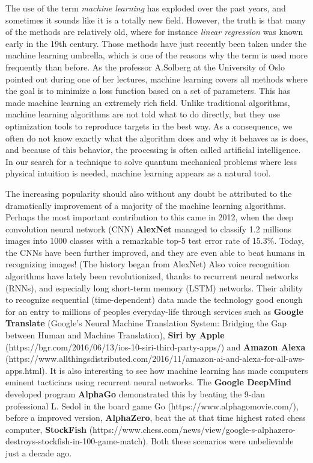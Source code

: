 The use of the term \textit{machine learning} has exploded over the past years, and sometimes it sounds like it is a totally new field. However, the truth is that many of the methods are relatively old, where for instance \textit{linear regression} was known early in the 19th century. \cite{legendre_nouvelles_1805, gauss_theoria_1809} Those methods have just recently been taken under the machine learning umbrella, which is one of the reasons why the term is used more frequently than before. As the professor A.Solberg at the University of Oslo pointed out during one of her lectures, machine learning covers all methods where the goal is to minimize a loss function based on a set of parameters. This has made machine learning an extremely rich field. Unlike traditional algorithms, machine learning algorithms are not told what to do directly, but they use optimization tools to reproduce targets in the best way. As a consequence, we often do not know exactly what the algorithm does and why it behaves as is does, and because of this behavior, the processing is often called artificial intelligence. In our search for a technique to solve quantum mechanical problems where less physical intuition is needed, machine learning appears as a natural tool.

The increasing popularity should also without any doubt be attributed to the dramatically improvement of a majority of the machine learning algorithms. Perhaps the most important contribution to this came in 2012, when the deep convolution neural network (CNN) \textbf{AlexNet} managed to classify 1.2 millions images into 1000 classes with a remarkable top-5 test error rate of 15.3\%. \cite{krizhevsky_imagenet_2012} Today, the CNNs have been further improved, and they are even able to beat humans in recognizing images! (The history began from AlexNet) Also voice recognition algorithms have lately been revolutionized, thanks to recurrent neural networks (RNNs), and especially long short-term memory (LSTM) networks. Their ability to recognize sequential (time-dependent) data made the technology good enough for an entry to millions of peoples everyday-life through services such as \textbf{Google Translate} (Google’s Neural Machine Translation System: Bridging the Gap between Human and Machine Translation), \textbf{Siri by Apple} (https://bgr.com/2016/06/13/ios-10-siri-third-party-apps/) and \textbf{Amazon Alexa} (https://www.allthingsdistributed.com/2016/11/amazon-ai-and-alexa-for-all-aws-apps.html). It is also interesting to see how machine learning has made computers eminent tacticians using recurrent neural networks. The \textbf{Google DeepMind} developed program \textbf{AlphaGo} demonstrated this by beating the 9-dan professional L. Sedol in the board game Go (https://www.alphagomovie.com/), before a improved version, \textbf{AlphaZero}, beat the at that time highest rated chess computer, \textbf{StockFish} (https://www.chess.com/news/view/google-s-alphazero-destroys-stockfish-in-100-game-match). Both these scenarios were unbelievable just a decade ago.

